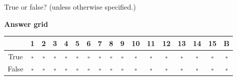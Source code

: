\documentclass[a4paper]{article}
\begin{document}
\pagestyle{empty}
\thispagestyle{fancy}

True or false? (unless otherwise specified.)

\begin{center}
    \textbf{Answer grid}\par\smallskip

    \smallskip
    \normalsize
    \renewcommand{\arraystretch}{1.35}
    \begin{tabular}{|c|*{16}{c|}}
        \hline
        & 1 & 2 & 3 & 4 & 5 & 6 & 7 & 8 & 9 & 10 & 11 & 12 & 13 & 14 & 15 & B \\
        \hline
        True  & $\square$ & $\square$ & $\square$ & $\square$ & $\square$ & $\square$ & $\square$ & $\square$ & $\square$ & $\square$ & $\square$ & $\square$ & $\square$ & $\square$ & $\square$ & $\square$ \\
        False & $\square$ & $\square$ & $\square$ & $\square$ & $\square$ & $\square$ & $\square$ & $\square$ & $\square$ & $\square$ & $\square$ & $\square$ & $\square$ & $\square$ & $\square$ & $\square$ \\
        \hline
    \end{tabular}
\end{center}
\end{document}
